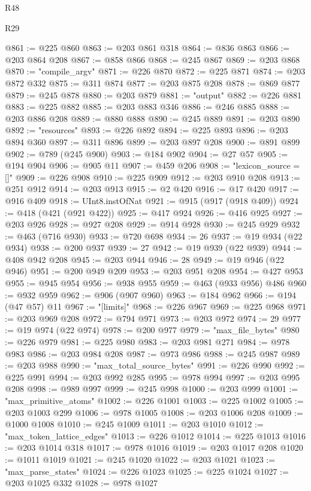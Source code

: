 \begin{lexlean}{R48}
\begin{lexlean}{R29}
\begin{coremodule}
{{{{{{{{{{{{{{{{{{{{{{{{{{{{{{{{{{{{{{{{{{{{{{{{{{{{{{{{{{{{{{{{{{{{{{{{{{{{{{{{{{{{{{{{{{{{{{{{{{{{{{{{{{{{{{{{{{{{{{{{{{{{{{{{{{{{{{{{{{{{{{{{{{{{{{{{{{{{{{{{{{{{{{{{{{{{{{{{{{{{{{{{{{{{{{{{{{{{{{{{{{{{{{{{{{{{{{{{{{@861 := @225 @860
@863 := @203 @861 @318
@864 := @836 @863
@866 := @203 @864 @208
@867 := @858 @866
@868 := @245 @867
@869 := @203 @868
@870 := "compile_argv"
@871 := @226 @870
@872 := @225 @871
@874 := @203 @872 @332
@875 := @311 @874
@877 := @203 @875 @208
@878 := @869 @877
@879 := @245 @878
@880 := @203 @879
@881 := "output"
@882 := @226 @881
@883 := @225 @882
@885 := @203 @883 @346
@886 := @246 @885
@888 := @203 @886 @208
@889 := @880 @888
@890 := @245 @889
@891 := @203 @890
@892 := "resources"
@893 := @226 @892
@894 := @225 @893
@896 := @203 @894 @360
@897 := @311 @896
@899 := @203 @897 @208
@900 := @891 @899
@902 := @789 (@245 @900)
@903 := @184 @902
@904 := @27 @57
@905 := @194 @904
@906 := @905 @11
@907 := @459 @206
@908 := "lexicon_source = []"
@909 := @226 @908
@910 := @225 @909
@912 := @203 @910 @208
@913 := @251 @912
@914 := @203 @913
@915 := @2 @420
@916 := @17 @420
@917 := @916 @409
@918 := UInt8.instOfNat
@921 := @915 (@917 (@918 @409))
@924 := @418 (@421 (@921 @422))
@925 := @417 @924
@926 := @416 @925
@927 := @203 @926
@928 := @927 @208
@929 := @914 @928
@930 := @245 @929
@932 := @463 (@716 @930)
@933 := @720 @698
@934 := 26
@937 := @19 @934 (@22 @934)
@938 := @200 @937
@939 := 27
@942 := @19 @939 (@22 @939)
@944 := @408 @942 @208
@945 := @203 @944
@946 := 28
@949 := @19 @946 (@22 @946)
@951 := @200 @949 @209
@953 := @203 @951 @208
@954 := @427 @953
@955 := @945 @954
@956 := @938 @955
@959 := @463 (@933 @956) @486
@960 := @932 @959
@962 := @906 (@907 @960)
@963 := @184 @962
@966 := @194 (@47 @57) @11
@967 := "[limits]"
@968 := @226 @967
@969 := @225 @968
@971 := @203 @969 @208
@972 := @794 @971
@973 := @203 @972
@974 := 29
@977 := @19 @974 (@22 @974)
@978 := @200 @977
@979 := "max_file_bytes"
@980 := @226 @979
@981 := @225 @980
@983 := @203 @981 @271
@984 := @978 @983
@986 := @203 @984 @208
@987 := @973 @986
@988 := @245 @987
@989 := @203 @988
@990 := "max_total_source_bytes"
@991 := @226 @990
@992 := @225 @991
@994 := @203 @992 @285
@995 := @978 @994
@997 := @203 @995 @208
@998 := @989 @997
@999 := @245 @998
@1000 := @203 @999
@1001 := "max_primitive_atoms"
@1002 := @226 @1001
@1003 := @225 @1002
@1005 := @203 @1003 @299
@1006 := @978 @1005
@1008 := @203 @1006 @208
@1009 := @1000 @1008
@1010 := @245 @1009
@1011 := @203 @1010
@1012 := "max_token_lattice_edges"
@1013 := @226 @1012
@1014 := @225 @1013
@1016 := @203 @1014 @318
@1017 := @978 @1016
@1019 := @203 @1017 @208
@1020 := @1011 @1019
@1021 := @245 @1020
@1022 := @203 @1021
@1023 := "max_parse_states"
@1024 := @226 @1023
@1025 := @225 @1024
@1027 := @203 @1025 @332
@1028 := @978 @1027
}}}}}}}}}}}}}}}}}}}}}}}}}}}}}}}}}}}}}}}}}}}}}}}}}}}}}}}}}}}}}}}}}}}}}}}}}}}}}}}}}}}}}}}}}}}}}}}}}}}}}}}}}}}}}}}}}}}}}}}}}}}}}}}}}}}}}}}}}}}}}}}}}}}}}}}}}}}}}}}}}}}}}}}}}}}}}}}}}}}}}}}}}}}}}}}}}}}}}}}}}}}}}}}}}}}}}}}}}}
\end{coremodule}
\end{lexlean}
\end{lexlean}
